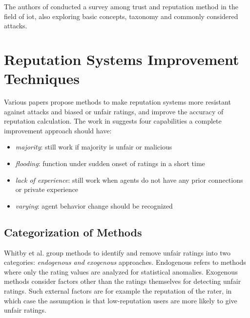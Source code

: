 \documentclass[%
    ]{\PathToTumTemplate/thesis/tum_thesis}
\begin{document}
The authors of \cite{ahmed_trust_2019} conducted a survey among trust and reputation method in the field of \gls{iot}, also exploring basic concepts, taxonomy and commonly considered attacks.



\section{Reputation Systems Improvement Techniques}\label{sec:related_improvements}

Various papers propose methods to make reputation systems more resistant against attacks and biased or unfair ratings, and improve the accuracy of reputation calculation.
The work in \cite{zhang_detailed_2008} suggests four capabilities a complete improvement approach should have:
\begin{itemize}
\item \emph{majority}: still work if majority is unfair or malicious
\item \emph{flooding}: function under sudden onset of ratings in a short time
\item \emph{lack of experience}: still work when agents do not have any prior connections or private experience
\item \emph{varying}: agent behavior change should be recognized
\end{itemize}


\subsection{Categorization of Methods}

Whitby et al. group methods to identify and remove unfair ratings into two categories: \emph{endogenous and exogenous} approaches\cite{whitby_filtering_2014}.
Endogenous refers to methods where only the rating values are analyzed for statistical anomalies.
Exogenous methods consider factors other than the ratings themselves for detecting unfair ratings.
Such external factors are for example the reputation of the rater, in which case the assumption is that low-reputation users are more likely to give unfair ratings.
\end{document}
